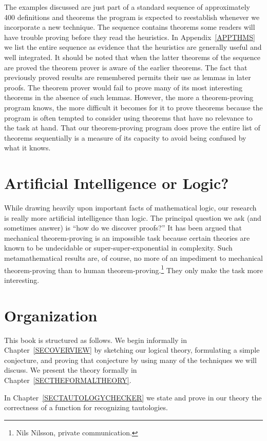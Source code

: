 \documentclass[11pt]{book}
\newcommand{\pubdefaulttextsize}{\large}
\begin{document}
The examples discussed are just part of a standard sequence of approximately
400 definitions and theorems the program is expected to reestablish whenever
we incorporate a new technique.  The sequence contains theorems some readers
will have trouble proving before they read the heuristics.
In Appendix~\ref{APPTHMS} we list the entire sequence as evidence
that the heuristics are generally useful and well integrated.  It should
be noted that when the latter theorems of the sequence are proved
the theorem prover is aware of the earlier theorems.   The fact that previously proved results are remembered permits
their use as lemmas in later proofs.  The theorem prover would fail to prove
many of its most interesting theorems in the absence of such lemmas.  However, the more a theorem-proving program knows, the more
difficult it becomes for it to prove theorems because the program
is often tempted to consider using theorems that have no relevance
to the task at hand.  That our theorem-proving program does prove
the entire list of theorems sequentially is a measure of its capacity
to avoid being confused by what it knows.
\section{Artificial Intelligence or Logic?}
\pubdefaulttextsize
While drawing heavily upon important facts of mathematical logic, our research
is really more artificial intelligence than logic.   The principal question
we ask (and sometimes answer) is ``how do we discover proofs?''
It has been argued that mechanical theorem-proving is an impossible task
because certain theories are known to be undecidable or super-super-exponential in complexity.
Such metamathematical results are, of course, no more of an impediment to
mechanical theorem-proving than to human theorem-proving.\footnote{Nils Nilsson, private communication.}  They only
make the task more interesting.
\section{Organization}
\pubdefaulttextsize
This book is structured as follows.  We begin informally
in Chapter~\ref{SECOVERVIEW} by sketching our logical theory,
formulating a simple conjecture, and proving that conjecture by using  many of the
techniques we will discuss.
We present the theory formally in Chapter~\ref{SECTHEFORMALTHEORY}.

In Chapter~\ref{SECTAUTOLOGYCHECKER}
we state and prove in our theory the correctness of a  function for recognizing
tautologies.
\end{document}
